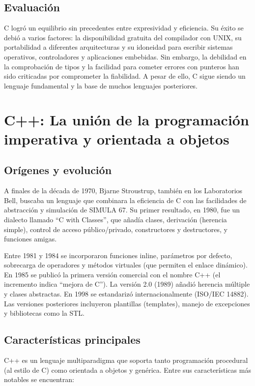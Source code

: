 \subsection{Evaluación}

C logró un equilibrio sin precedentes entre expresividad y eficiencia. Su éxito se debió a varios factores: la disponibilidad gratuita del compilador con UNIX, su portabilidad a diferentes arquitecturas y su idoneidad para escribir sistemas operativos, controladores y aplicaciones embebidas. Sin embargo, la debilidad en la comprobación de tipos y la facilidad para cometer errores con punteros han sido criticadas por comprometer la fiabilidad. A pesar de ello, C sigue siendo un lenguaje fundamental y la base de muchos lenguajes posteriores.

\section{C++: La unión de la programación imperativa y orientada a objetos}

\subsection{Orígenes y evolución}

A finales de la década de 1970, Bjarne Stroustrup, también en los Laboratorios Bell, buscaba un lenguaje que combinara la eficiencia de C con las facilidades de abstracción y simulación de SIMULA 67. Su primer resultado, en 1980, fue un dialecto llamado ``C with Classes'', que añadía clases, derivación (herencia simple), control de acceso público/privado, constructores y destructores, y funciones amigas.

Entre 1981 y 1984 se incorporaron funciones inline, parámetros por defecto, sobrecarga de operadores y métodos virtuales (que permiten el enlace dinámico). En 1985 se publicó la primera versión comercial con el nombre C++ (el incremento indica ``mejora de C''). La versión 2.0 (1989) añadió herencia múltiple y clases abstractas. En 1998 se estandarizó internacionalmente (ISO/IEC 14882). Las versiones posteriores incluyeron plantillas (templates), manejo de excepciones y bibliotecas como la STL.

\subsection{Características principales}

C++ es un lenguaje multiparadigma que soporta tanto programación procedural (al estilo de C) como orientada a objetos y genérica. Entre sus características más notables se encuentran:

